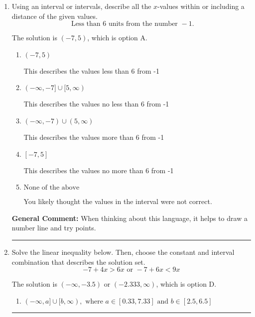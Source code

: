 \documentclass{extbook}[14pt]
\newcommand{\litem}[1]{\item #1

\rule{\textwidth}{0.4pt}}
\begin{document}
\begin{enumerate}
{\begin{enumerate}[label=\Alph*.]
This describes the values no more than 7 from -2
\item \( (-9, 5) \)

This describes the values less than 7 from -2
\item \( (-\infty, -9) \cup (5, \infty) \)

This describes the values more than 7 from -2
\item \( \text{None of the above} \)

You likely thought the values in the interval were not correct.
\end{enumerate}

\textbf{General Comment:} When thinking about this language, it helps to draw a number line and try points.
}
\litem{
Using an interval or intervals, describe all the $x$-values within or including a distance of the given values.
\[ \text{ Less than } 6 \text{ units from the number } -1. \]

The solution is \( (-7, 5) \), which is option A.\begin{enumerate}[label=\Alph*.]
\item \( (-7, 5) \)

This describes the values less than 6 from -1
\item \( (-\infty, -7] \cup [5, \infty) \)

This describes the values no less than 6 from -1
\item \( (-\infty, -7) \cup (5, \infty) \)

This describes the values more than 6 from -1
\item \( [-7, 5] \)

This describes the values no more than 6 from -1
\item \( \text{None of the above} \)

You likely thought the values in the interval were not correct.
\end{enumerate}

\textbf{General Comment:} When thinking about this language, it helps to draw a number line and try points.
}
\litem{
Solve the linear inequality below. Then, choose the constant and interval combination that describes the solution set.
\[ -7 + 4 x > 6 x \text{ or } -7 + 6 x < 9 x \]

The solution is \( (-\infty, -3.5) \text{ or } (-2.333, \infty) \), which is option D.\begin{enumerate}[label=\Alph*.]
\item \( (-\infty, a] \cup [b, \infty), \text{ where } a \in [0.33, 7.33] \text{ and } b \in [2.5, 6.5] \)


\end{enumerate}}
\end{enumerate}
\end{document}
